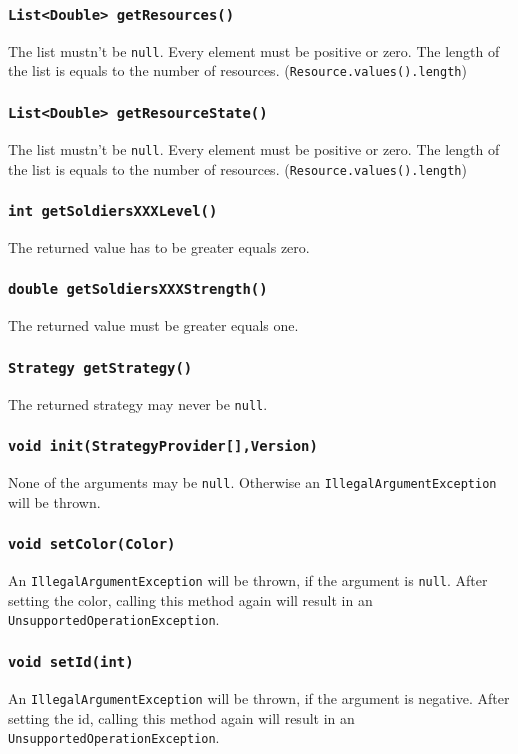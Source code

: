 \documentclass{article}
\begin{document}
\subsubsection{\texttt{List<Double> getResources()}}
The list mustn't be \texttt{null}. Every element must be positive or zero.
The length of the list is equals to the number of resources. (\texttt{Resource.values().length})

\subsubsection{\texttt{List<Double> getResourceState()}}
The list mustn't be \texttt{null}. Every element must be positive or zero.
The length of the list is equals to the number of resources. (\texttt{Resource.values().length})

\subsubsection{\texttt{int getSoldiersXXXLevel()}}
The returned value has to be greater equals zero.

\subsubsection{\texttt{double getSoldiersXXXStrength()}}
The returned value must be greater equals one.

\subsubsection{\texttt{Strategy getStrategy()}}
The returned strategy may never be \texttt{null}.

\subsubsection{\texttt{void init(StrategyProvider[],Version)}}
None of the arguments may be \texttt{null}. Otherwise an \texttt{IllegalArgumentException} will be thrown.

\subsubsection{\texttt{void setColor(Color)}}
An \texttt{IllegalArgumentException} will be thrown, if the argument is \texttt{null}.
After setting the color, calling this method again will result in an \texttt{UnsupportedOperationException}.

\subsubsection{\texttt{void setId(int)}}
An \texttt{IllegalArgumentException} will be thrown, if the argument is negative.
After setting the id, calling this method again will result in an \texttt{UnsupportedOperationException}.
\end{document}
